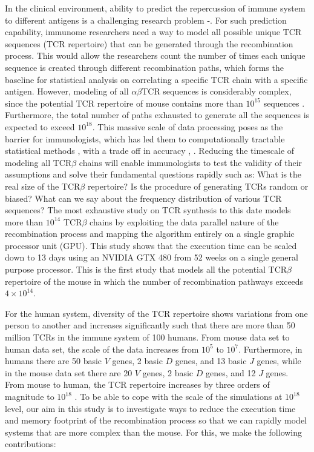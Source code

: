 In the clinical environment, ability to predict the repercussion of immune system to different antigens is a challenging research problem \cite{b16}-\cite{b20}. For such prediction capability, immunome researchers need a way to model all possible unique TCR sequences (TCR repertoire) that can be generated through the recombination process. This would allow the researchers count the number of times each unique sequence is created through different recombination paths, which forms the baseline for statistical analysis on correlating a specific TCR chain with a specific antigen. However, modeling of all $\alpha\beta$TCR sequences is considerably complex, since the potential TCR repertoire of mouse contains more than $10^{15}$ sequences \cite{b24}. Furthermore, the total number of paths exhausted to generate all the sequences is expected to exceed $10^{18}$. This massive scale of data processing poses as the barrier for immunologists, which has led them to computationally tractable statistical methods \cite{b21}, \cite{b22}  with a trade off  in accuracy \cite{b21}, \cite{b22} . Reducing the timescale of modeling all TCR$\beta$ chains will enable immunologists to test the validity of their assumptions and solve their fundamental questions rapidly such as: What is the real size of the TCR$\beta$ repertoire? Is the procedure of generating TCRs random or biased? What can we say about the frequency distribution of various TCR sequences? The most exhaustive study on TCR synthesis to this date \cite{b2} models more than $10^{14}$ TCR$\beta$ chains by exploiting the data parallel nature of the recombination process and mapping the algorithm entirely on a single graphic processor unit (GPU). This study shows that the execution time can be scaled down to 13 days using an NVIDIA GTX 480 from 52 weeks on a single general purpose processor. This is the first study that models all the potential TCR$\beta$ repertoire of the mouse in which the number of recombination pathways exceeds ${4\times 10^{14}}$.


For the human system, diversity of the TCR repertoire shows variations from one person to another and increases significantly such that there are more than 50 million TCRs in the immune system of 100 humans. From mouse data set to human data set, the scale of the data increases from $10^{5}$ to $10^{7}$. Furthermore, in humans there are 50 basic $V$ genes, 2 basic $D$ genes, and 13 basic $J$ genes, while in the mouse data set there are 20 $V$ genes, 2 basic $D$ genes, and 12 $J$ genes. From mouse to human, the TCR repertoire increases by three orders of magnitude to $10^{18}$ \cite{b2}. To be able to cope with the scale of the simulations at $10^{18}$ level, our aim in this study is to investigate ways to reduce the execution time and memory footprint of the recombination process so that we can rapidly model systems that are more complex than the mouse. For this, we make the following contributions:


